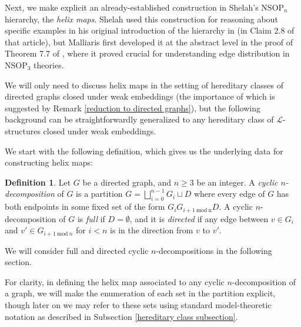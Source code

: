 \documentclass{amsart}
\theoremstyle{definition}
\newtheorem{definition}[theorem]{Definition}
\theoremstyle{remark}
\numberwithin{equation}{section}
\begin{document}
Next, we make explicit an already-established construction in Shelah's $\mathrm{NSOP}_{n}$ hierarchy, the \textit{helix maps}. Shelah used this construction for reasoning about specific examples in his original introduction of the hierarchy in \cite{She95} (in Claim 2.8 of that article), but Malliaris first developed it at the abstract level in the proof of Theorem 7.7 of \cite{Mal10b}, where it proved crucial for understanding edge distribution in $\mathrm{NSOP}_{3}$ theories.

We will only need to discuss helix maps in the setting of hereditary classes of directed graphs closed under weak embeddings (the importance of which is suggested by Remark \ref{reduction to directed graphs}), but the following background can be straightforwardly generalized to any hereditary class of $\mathcal{L}$-structures closed under weak embeddings.


We start with the following definition, which gives us the underlying data for constructing helix maps:

\begin{definition}\label{cyclic n-decomposition}
    Let $G$ be a directed graph, and $n \geq 3$ be an integer. A \textit{cyclic $n$-decomposition} of $G$ is a partition $G = \bigsqcup^{n-1}_{i =0} G_{i} \sqcup D$ where every edge of $G$ has both endpoints in some fixed set of the form $G_{i}G_{i+1 \mathrm{\: mod \: n}}D$. A cyclic $n$-decomposition of $G$ is \textit{full} if $D = \emptyset$, and it is \textit{directed} if any edge between $v \in G_{i}$ and $v' \in G_{i + 1 \mathrm{\: mod\:  } n}$ for $i < n$ is in the direction from $v$ to $v'$.
\end{definition}

We will consider full and directed cyclic $n$-decompositions in the following section.

For clarity, in defining the helix map associated to any cyclic $n$-decomposition of a graph, we will make the enumeration of each set in the partition explicit, though later on we may refer to these sets using standard model-theoretic notation as described in Subsection \ref{hereditary class subsection}. 
\end{document}
